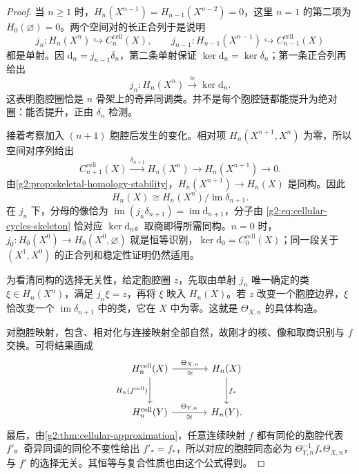 \begin{proof}
	当 \(n\ge1\) 时，\(H_n(X^{n-1})=H_{n-1}(X^{n-2})=0\)，这里 \(n=1\) 的第二项为 \(H_0(\varnothing)=0\)。两个空间对的长正合列于是说明
	\[
		j_n:H_n(X^n)\hookrightarrow C_n^{\mathrm{cell}}(X),\qquad
		j_{n-1}:H_{n-1}(X^{n-1})\hookrightarrow C_{n-1}^{\mathrm{cell}}(X)
	\]
	都是单射。因 \(\mathrm{d}_n=j_{n-1}\delta_n\)，第二条单射保证 \(\ker\mathrm{d}_n=\ker\delta_n\)；第一条正合列再给出
	\begin{equation}\label{g2:eq:cellular-cycles-skeleton}
		j_n:H_n(X^n)\xrightarrow{\ \cong\ }\ker\mathrm{d}_n.
	\end{equation}
	这表明胞腔圈恰是 \(n\) 骨架上的奇异同调类。并不是每个胞腔链都能提升为绝对圈：能否提升，正由 \(\delta_n\) 检测。

	接着考察加入 \((n+1)\) 胞腔后发生的变化。相对项 \(H_n(X^{n+1},X^n)\) 为零，所以空间对序列给出
	\[
		C_{n+1}^{\mathrm{cell}}(X)\xrightarrow{\delta_{n+1}}H_n(X^n)
		\longrightarrow H_n(X^{n+1})\longrightarrow0.
	\]
	由\cref{g2:prop:skeletal-homology-stability}，\(H_n(X^{n+1})\to H_n(X)\) 是同构。因此
	\[
		H_n(X)\cong H_n(X^n)/\operatorname{im}\delta_{n+1}.
	\]
	在 \(j_n\) 下，分母的像恰为 \(\operatorname{im}(j_n\delta_{n+1})=\operatorname{im}\mathrm{d}_{n+1}\)，分子由 \eqref{g2:eq:cellular-cycles-skeleton} 恰对应 \(\ker\mathrm{d}_n\)。取商即得所需同构。\(n=0\) 时，\(j_0:H_0(X^0)\to H_0(X^0,\varnothing)\) 就是恒等识别，\(\ker\mathrm{d}_0=C_0^{\mathrm{cell}}(X)\)；同一段关于 \((X^1,X^0)\) 的正合列和稳定性证明仍然适用。

	为看清同构的选择无关性，给定胞腔圈 \(z\)，先取由单射 \(j_n\) 唯一确定的类 \(\xi\in H_n(X^n)\)，满足 \(j_n\xi=z\)，再将 \(\xi\) 映入 \(H_n(X)\)。若 \(z\) 改变一个胞腔边界，\(\xi\) 恰改变一个 \(\operatorname{im}\delta_{n+1}\) 中的类，它在 \(X\) 中为零。这就是 \(\Theta_{X,n}\) 的具体构造。

	对胞腔映射，包含、相对化与连接映射全部自然，故刚才的核、像和取商识别与 \(f\) 交换。可将结果画成
	\[
		\begin{tikzcd}[column sep=large,row sep=large]
			H_n^{\mathrm{cell}}(X) \arrow[r,"\Theta_{X,n}","\cong"'] \arrow[d,"H_n(f^{\mathrm{cell}})"']
				& H_n(X) \arrow[d,"f_*"] \\
			H_n^{\mathrm{cell}}(Y) \arrow[r,"\Theta_{Y,n}","\cong"']
				& H_n(Y).
		\end{tikzcd}
	\]
	最后，由\cref{g2:thm:cellular-approximation}，任意连续映射 \(f\) 都有同伦的胞腔代表 \(f'\)。奇异同调的同伦不变性给出 \(f'_*=f_*\)，所以对应的胞腔同态必为 \(\Theta_{Y,n}^{-1}f_*\Theta_{X,n}\)，与 \(f'\) 的选择无关。其恒等与复合性质也由这个公式得到。
\end{proof}

